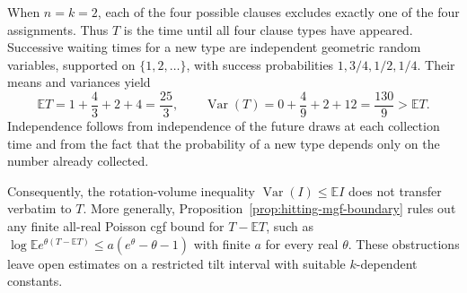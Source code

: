 \begin{example}
\label{ex:coupon-hitting-time}
When $n=k=2$, each of the four possible clauses excludes exactly one
of the four assignments. Thus $T$ is the time until all four clause
types have appeared. Successive waiting times for a new type are
independent geometric random variables, supported on
$\{1,2,\ldots\}$, with success probabilities
$1,3/4,1/2,1/4$. Their means and variances yield
\[
 \mathbb E T=1+\frac43+2+4=\frac{25}{3},\qquad
 \operatorname{Var}(T)=0+\frac49+2+12=\frac{130}{9}
 >\mathbb E T.
\]
Independence follows from independence of the future draws at each
collection time and from the fact that the probability of a new type
depends only on the number already collected.

Consequently, the rotation-volume inequality
$\operatorname{Var}(I)\le\mathbb E I$ does not transfer verbatim to
$T$. More generally, Proposition~\ref{prop:hitting-mgf-boundary}
rules out any finite all-real Poisson cgf bound for $T-\mathbb E T$,
such as $\log\mathbb E e^{\theta(T-\mathbb E T)}
\le a(e^\theta-\theta-1)$ with finite $a$ for every real $\theta$.
These obstructions leave open estimates on a restricted tilt interval
with suitable $k$-dependent constants.
\end{example}
